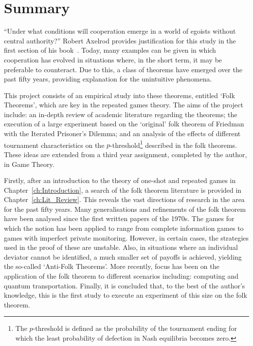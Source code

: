 \chapter{Summary}
``Under what conditions will cooperation emerge in a world of egoists without
central authority?'' Robert Axelrod provides justification for this study in
the first section of his book~\cite{Axelrod1984a}. Today, many examples can be
given in which cooperation has evolved in situations where, in the short term,
it may be preferable to counteract. Due to this, a class of theorems have
emerged over the past fifty years, providing explanation for the unintuitive
phenomena.

This project consists of an empirical study into these theorems, entitled
`Folk Theorems', which are key in the repeated games theory. The aims of
the project include: an in-depth review of academic literature regarding the
theorems; the execution of a large experiment based on the
`original' folk theorem of Friedman~\cite{Friedman1971} with the Iterated
Prisoner's Dilemma; and an analysis of the effects of different tournament
characteristics on the \(p\)-threshold\footnote{The \(p\)-threshold is defined
as the probability of the tournament ending for which the
least probability of defection in Nash equilibria becomes zero.} described in the folk theorems. These
ideas are extended from a third year assignment, completed by the
author, in Game Theory.

Firstly, after an introduction to the theory of one-shot and repeated games in Chapter~\ref{ch:Introduction}, a
search of the folk theorem literature is provided in Chapter~\ref{ch:Lit_Review}. This reveals the vast
directions of research in the area for the past fifty years. Many
generalisations and refinements of the folk theorem have been analysed since the
first written papers of the 1970s. The games for which the notion has been
applied to range from complete information games to games with imperfect
private monitoring. However, in certain cases, the strategies used in the proof
of these are unstable. Also, in situations where an individual deviator cannot
be identified, a much smaller set of payoffs is achieved, yielding the
so-called `Anti-Folk Theorems'. More recently, focus has been on the application
of the folk theorem to different scenarios including: computing and quantum transportation.
Finally, it is concluded that, to the best of the author's knowledge, this is
the first study to execute an experiment of this size on the folk theorem.

